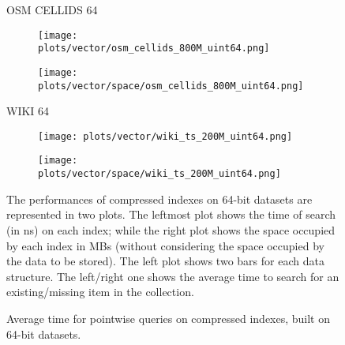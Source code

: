 \documentclass{article}
\begin{document}
\begin{figure}[!htbp]
{\begin{minipage}[t][0.98\textheight][t]{\textwidth}
    \begin{minipage}{0.03\linewidth}
    \begin{sideways}\small OSM CELLIDS 64\end{sideways}
    \end{minipage}
    \begin{minipage}{0.3\linewidth}
        \begin{figure}[H]
        \texttt{[image: plots/vector/osm\_cellids\_800M\_uint64.png]}
        \end{figure}
    \end{minipage}
    \begin{minipage}{0.3\linewidth}
        \begin{figure}[H]
            \texttt{[image: plots/vector/space/osm\_cellids\_800M\_uint64.png]}
        \end{figure}
    \end{minipage}
    \vspace*{-20px}

    \begin{minipage}{0.03\linewidth}
    \begin{sideways}\small WIKI 64\end{sideways}
    \end{minipage}
    \begin{minipage}{0.3\linewidth}
        \begin{figure}[H]
        \texttt{[image: plots/vector/wiki\_ts\_200M\_uint64.png]}
        \end{figure}
    \end{minipage}
    \begin{minipage}{0.3\linewidth}
        \begin{figure}[H]
            \texttt{[image: plots/vector/space/wiki\_ts\_200M\_uint64.png]}
        \end{figure}
    \end{minipage}
    \vfill
    
    \centering
    \begin{minipage}{\linewidth}
        The performances of compressed indexes on 64-bit datasets are represented in two plots. The leftmost plot shows the time of search (in ns) on each index; while the right plot shows the space occupied by each index in MBs (without considering the space occupied by the data to be stored). The left plot shows two bars for each data structure. The left/right one shows the average time to search for an existing/missing item in the collection.\end{minipage}
    \vspace{30px}
\end{minipage}
}
\caption{Average time for pointwise queries on compressed indexes, built on 64-bit datasets.}
\end{figure}
\end{document}
